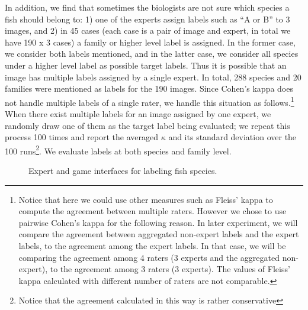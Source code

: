 In addition, we find that sometimes the biologists are not sure which
species a fish should belong to: 1) one of the experts assign labels
such as ``A or B'' to 3 images, and 2) in 45 cases (each case is a
pair of image and expert, in total we have 190 x 3 cases) a family or
higher level label is assigned. 
In the former case, we consider both labels mentioned, and in the
latter case, we consider all species under a higher level label as
possible target labels.  Thus it is possible that an image has
multiple labels assigned by a single expert.  In total, 288 species
and 20 families were mentioned as labels for the 190 images. 
%
Since Cohen's kappa does not handle multiple labels of a single rater,
we handle this situation as follows.\footnote{Notice that here we could
use other measures such as Fleiss' kappa to compute the agreement
between multiple raters. However we chose to use pairwise Cohen's
kappa for the following reason. In later experiment, we will compare
the agreement between aggregated non-expert labels and the expert
labels, to the agreement among the expert labels. In that case, we
will be comparing the agreement among 4 raters (3 experts and the
aggregated non-expert), to the agreement among 3 raters (3 experts).
The values of Fleiss' kappa calculated with different number of raters
are not comparable.} 
When there exist multiple labels for an image assigned by one expert,
we randomly draw one of them as the target label being evaluated; we
repeat this process 100 times and report the averaged $\kappa$ and its
standard deviation over the 100 runs\footnote{Notice that the
agreement calculated in this way is rather conservative}. We evaluate
labels at both species and family level.

%
\begin{figure}[t!]
\centering
{}
\caption{Expert and game interfaces for labeling fish species.}
\end{figure}

